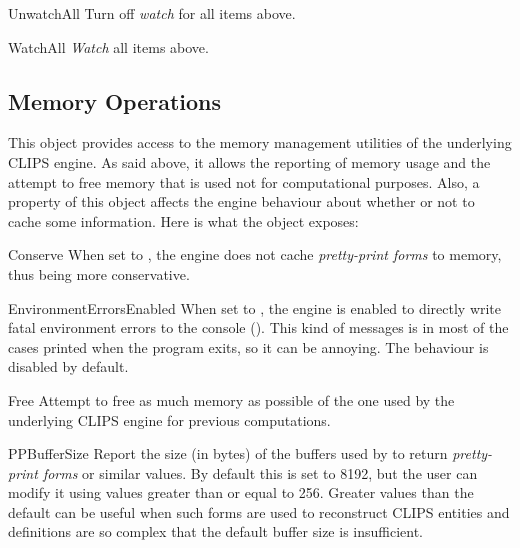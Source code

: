 \begin{methoddesc}{UnwatchAll}{}
Turn off \emph{watch} for all items above.
\end{methoddesc}

\begin{methoddesc}{WatchAll}{}
\emph{Watch} all items above.
\end{methoddesc}



\subsection{Memory Operations\label{pyclips-cl-statusconf-memory}}

This object provides access to the memory management utilities of the
underlying CLIPS engine. As said above, it allows the reporting of memory
usage and the attempt to free memory that is used not for computational
purposes. Also, a property of this object affects the engine behaviour
about whether or not to cache some information. Here is what the object
exposes:

\begin{memberdesc}[property]{Conserve}
When set to , the engine does not cache \emph{pretty-print
forms} to memory, thus being more conservative.
\end{memberdesc}

\begin{memberdesc}[property]{EnvironmentErrorsEnabled}
When set to , the engine is enabled to directly write
fatal environment errors to the console (). This kind
of messages is in most of the cases printed when the program exits, so
it can be annoying. The behaviour is disabled by default.
\end{memberdesc}

\begin{methoddesc}{Free}{}
Attempt to free as much memory as possible of the one used by the
underlying CLIPS engine for previous computations.
\end{methoddesc}

\begin{memberdesc}[property]{PPBufferSize}
Report the size (in bytes) of the buffers used by \pyclips{} to return
\emph{pretty-print forms} or similar values. By default this is set to
8192, but the user can modify it using values greater than or equal to
256. Greater values than the default can be useful when such forms are
used to reconstruct CLIPS entities and definitions are so complex that
the default buffer size is insufficient.
\end{memberdesc}

